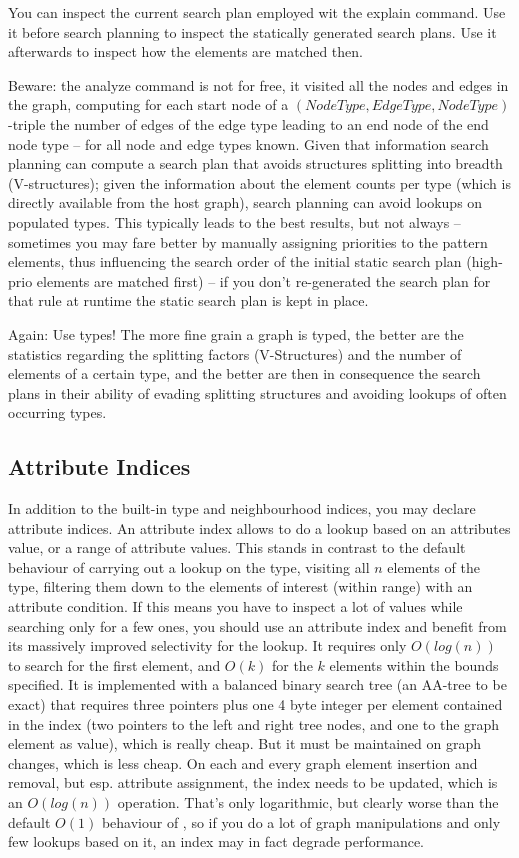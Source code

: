 You can inspect the current search plan employed wit the explain command.
Use it before search planning to inspect the statically generated search plans.
Use it afterwards to inspect how the elements are matched then.

Beware: the analyze command is not for free, it visited all the nodes and edges in the graph, computing for each start node of a $(NodeType, EdgeType, NodeType)$-triple the number of edges of the edge type leading to an end node of the end node type -- for all node and edge types known.
Given that information search planning can compute a search plan that avoids structures splitting into breadth (V-structures);
given the information about the element counts per type (which is directly available from the host graph), 
search planning can avoid lookups on populated types.
This typically leads to the best results, but not always -- sometimes you may fare better by manually assigning priorities to the pattern elements, thus influencing the search order of the initial static search plan (high-prio elements are matched first) -- if you don't re-generated the search plan for that rule at runtime the static search plan is kept in place.

Again: Use types!
The more fine grain a graph is typed, the better are the statistics regarding the splitting factors (V-Structures) and the number of elements of a certain type, and the better are then in consequence the search plans in their ability of evading splitting structures and avoiding lookups of often occurring types.

\subsection{Attribute Indices}
In addition to the built-in type and neighbourhood indices, you may declare attribute indices.
An attribute index allows to do a lookup based on an attributes value, or a range of attribute values.
This stands in contrast to the default behaviour of carrying out a lookup on the type, visiting all $n$ elements of the type, filtering them down to the elements of interest (within range) with an attribute condition.
If this means you have to inspect a lot of values while searching only for a few ones, you should use an attribute index and benefit from its massively improved selectivity for the lookup.
It requires only $O(log(n))$ to search for the first element, and $O(k)$ for the $k$ elements within the bounds specified.
It is implemented with a balanced binary search tree (an AA-tree\cite{Andersson93balancedsearch} to be exact) that requires three pointers plus one 4 byte integer per element contained in the index (two pointers to the left and right tree nodes, and one to the graph element as value), which is really cheap.
But it must be maintained on graph changes, which is less cheap.
On each and every graph element insertion and removal, but esp. attribute assignment, the index needs to be updated, which is an $O(log(n))$ operation.
That's only logarithmic, but clearly worse than the default $O(1)$ behaviour of \GrG{}, so if you do a lot of graph manipulations and only few lookups based on it, an index may in fact degrade performance.

